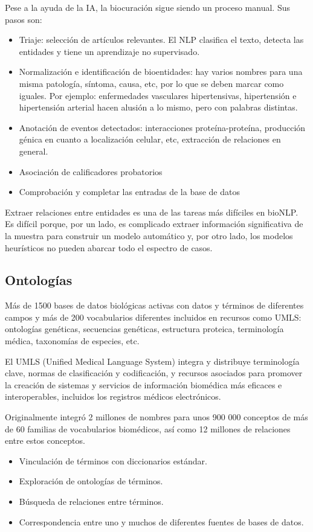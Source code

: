 Pese a la ayuda de la IA, la biocuración sigue siendo un proceso manual. Sus pasos son:
\begin{itemize}
\item Triaje: selección de artículos relevantes. El NLP clasifica el texto, detecta las entidades y tiene un aprendizaje no supervisado.
\item Normalización e identificación de bioentidades: hay varios nombres para una  misma patología, síntoma, causa, etc, por lo que se deben marcar como iguales. Por ejemplo: enfermedades vasculares hipertensivas, hipertensión e hipertensión arterial hacen alusión a lo mismo, pero con palabras distintas.
\item Anotación de eventos detectados: interacciones proteína-proteína, producción génica en cuanto a localización celular, etc, extracción de relaciones en general.
\item Asociación de calificadores probatorios
\item Comprobación y completar las entradas de la base de datos
\end{itemize}

Extraer relaciones entre entidades es una de las tareas más difíciles en
bioNLP. Es difícil porque, por un lado, es complicado extraer información significativa de la muestra para construir un modelo automático y, por otro lado, los modelos heurísticos no pueden abarcar todo el espectro de casos.

\subsection{Ontologías}
Más de 1500 bases de datos biológicas activas con datos y términos de diferentes campos y más de 200 vocabularios diferentes incluidos en recursos como UMLS: ontologías genéticas, secuencias genéticas, estructura proteica, terminología médica, taxonomías de especies, etc.

El UMLS (Unified Medical Language System) integra y distribuye terminología clave, normas de clasificación y
codificación, y recursos asociados para promover la creación de sistemas y servicios de información biomédica más eficaces e interoperables, incluidos los registros médicos electrónicos.

Originalmente integró 2 millones de nombres para unos 900 000 conceptos de más de 60 familias de vocabularios biomédicos, así como 12 millones de relaciones entre estos conceptos.
\begin{itemize}
\item Vinculación de términos con diccionarios estándar.
\item Exploración de ontologías de términos.
\item Búsqueda de relaciones entre términos.
\item Correspondencia entre uno y muchos de diferentes fuentes de bases de datos.
\end{itemize}

